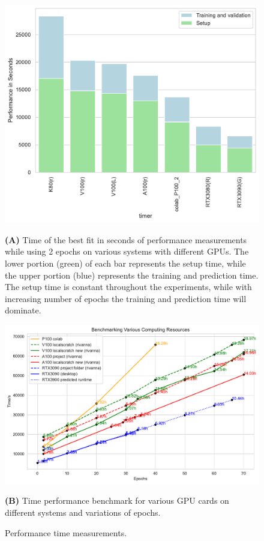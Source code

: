 \documentclass[utf8]{FrontiersinVancouver} %
\begin{document}
\begin{figure}[p]

  \centering\includegraphics[width=0.70\columnwidth]{images/Graphics_Cards_BestFit_bar}

  {\bf (A)} Time of the best fit in seconds of performance measurements while using 2 epochs on various systems with different GPUs. The lower portion (green) of each bar represents the setup time, while the upper portion (blue) represents the training and prediction time. The setup time is constant throughout the experiments, while with increasing number of epochs the training and prediction time will dominate. 
  
  
  \bigskip

  \centering\includegraphics[width=0.9\columnwidth]{images/Benchmark_comp_resource_new}

  {\bf (B)} Time performance benchmark for various GPU cards on different systems and variations of epochs.
  
  
    
  \caption{Performance time measurements.}
  \label{fig:performance-projection}
\end{figure}
\end{document}
